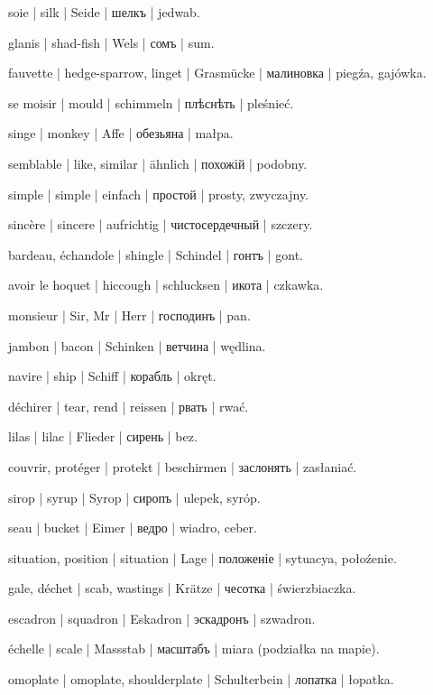 \begin{outdent}{1em}
soie | silk | Seide | шелкъ | jedwab.

glanis | shad-fish | Wels | сомъ | sum.

fauvette | hedge-sparrow, linget | Grasmücke | малиновка | piegźa, gajówka.

se moisir | mould | schimmeln | плѣснѣть | pleśnieć.

singe | monkey | Affe | обезьяна | małpa.

semblable | like, similar | ähnlich | похожій | podobny.

simple | simple | einfach | простой | prosty, zwyczajny.

sincère | sincere | aufrichtig | чистосердечный | szczery.

bardeau, échandole | shingle | Schindel | гонтъ | gont.

avoir le hoquet | hiccough | schlucksen | икота | czkawka.

monsieur | Sir, Mr | Herr | господинъ | pan.

jambon | bacon | Schinken | ветчина | wędlina.

navire | ship | Schiff | корабль | okręt.

déchirer | tear, rend | reissen | рвать | rwać.

lilas | lilac | Flieder | сирень | bez.

couvrir, protéger | protekt | beschirmen | заслонять | zasłaniać.

sirop | syrup | Syrop | сиропъ | ulepek, syróp.

seau | bucket | Eimer | ведро | wiadro, ceber.

situation, position | situation | Lage | положеніе | sytuacya, połoźenie.

gale, déchet | scab, wastings | Krätze | чесотка | świerzbiaczka.

escadron | squadron | Eskadron | эскадронъ | szwadron.

échelle | scale | Massstab | масштабъ | miara (podziałka na mapie).

omoplate | omoplate, shoulderplate | Schulterbein | лопатка | łopatka.


\end{outdent}
